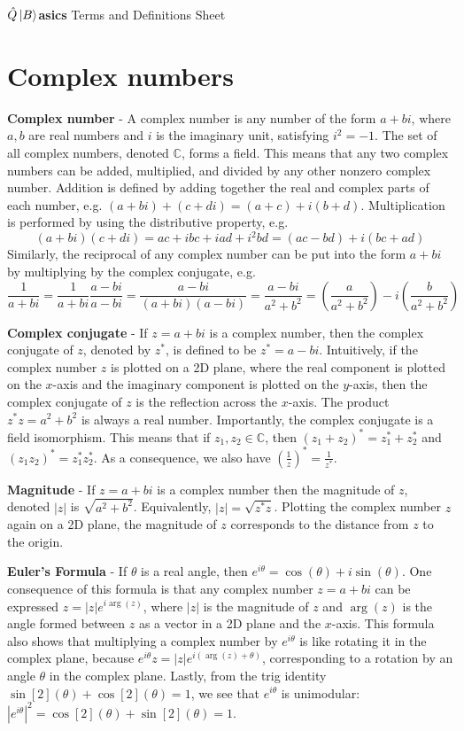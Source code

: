 \documentclass{article}
\begin{document}
\begin{center}
{\Huge \textbf{$\hat Q\ket{B}$asics} \Large Terms and Definitions Sheet}
\end{center}

\section{Complex numbers}

\textbf{Complex number} - A complex number is any number of the form $a + bi$, where $a,b$ are real numbers and $i$ is the imaginary unit, satisfying $i^2 = -1$. The set of all complex numbers, denoted $\mathbb C$, forms a field. This means that any two complex numbers can be added, multiplied, and divided by any other nonzero complex number. Addition is defined by adding together the real and complex parts of each number, e.g. $(a+bi)+(c+di) = (a+c) + i(b+d)$. Multiplication is performed by using the distributive property, e.g. 
$$
(a+bi)(c+di) = ac + ibc + iad + i^2bd = (ac-bd) + i(bc+ad)
$$
Similarly, the reciprocal of any complex number can be put into the form $a+bi$ by multiplying by the complex conjugate, e.g.
$$
\frac{1}{a+bi} = \frac{1}{a+bi}\frac{a-bi}{a-bi} = \frac{a-bi}{(a+bi)(a-bi)} = \frac{a-bi}{a^2+b^2} = \left(\frac{a}{a^2+b^2}\right) - i\left(\frac{b}{a^2+b^2}\right)
$$

\textbf{Complex conjugate} - If $z = a+bi$ is a complex number, then the complex conjugate of $z$, denoted by $z^\ast$, is defined to be $z^\ast = a - bi$. Intuitively, if the complex number $z$ is plotted on a 2D plane, where the real component is plotted on the $x$-axis and the imaginary component is plotted on the $y$-axis, then the complex conjugate of $z$ is the reflection across the $x$-axis. The product $z^\ast z = a^2 + b^2$ is always a real number. Importantly, the complex conjugate is a field isomorphism. This means that if $z_1, z_2 \in \mathbb C$, then $(z_1 + z_2)^\ast = z_1^\ast + z_2^\ast$ and $(z_1z_2)^\ast = z_1^\ast z_2^\ast$. As a consequence, we also have $\left(\frac{1}{z}\right)^\ast = \frac{1}{z^\ast}$.

\textbf{Magnitude} - If $z = a+bi$ is a complex number then the magnitude of $z$, denoted $|z|$ is $\sqrt{a^2 + b^2}$. Equivalently, $|z| = \sqrt{z^\ast z}$. Plotting the complex number $z$ again on a 2D plane, the magnitude of $z$ corresponds to the distance from $z$ to the origin.

\textbf{Euler's Formula} - If $\theta$ is a real angle, then $e^{i\theta} = \cos(\theta) + i\sin(\theta)$. One consequence of this formula is that any complex number $z = a+bi$ can be expressed $z = |z|e^{i\arg(z)}$, where $|z|$ is the magnitude of $z$ and $\arg(z)$ is the angle formed between $z$ as a vector in a 2D plane and the $x$-axis. This formula also shows that multiplying a complex number by $e^{i\theta}$ is like rotating it in the complex plane, because $e^{i\theta}z = |z|e^{i(\arg(z)+\theta)}$, corresponding to a rotation by an angle $\theta$ in the complex plane. Lastly, from the trig identity $\sin[2](\theta) + \cos[2](\theta) = 1$, we see that $e^{i\theta}$ is unimodular: $|e^{i\theta}|^2 = \cos[2](\theta) + \sin[2](\theta) = 1$.
\end{document}
